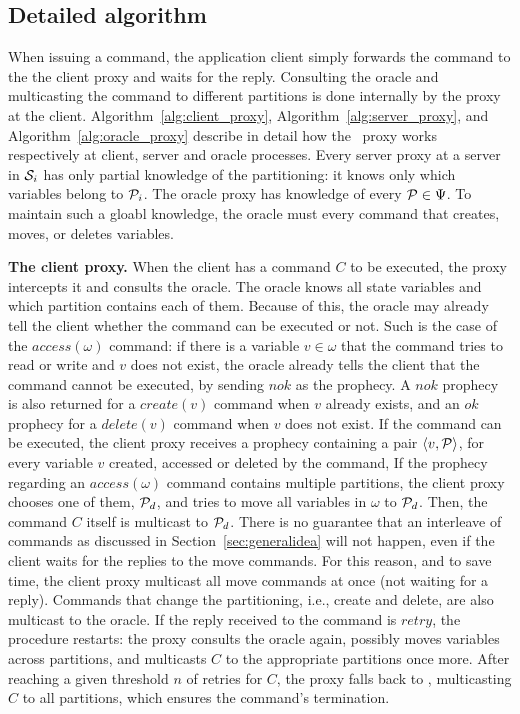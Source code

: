 \subsection{Detailed algorithm}
\label{sec:algorithm}


When issuing a command, the application client simply forwards the command to the the client proxy and waits for the reply.
Consulting the oracle and multicasting the command to different partitions is done internally by the proxy at the client.
Algorithm~\ref{alg:client_proxy}, Algorithm~\ref{alg:server_proxy}, and Algorithm~\ref{alg:oracle_proxy} describe in detail how the \dssmr\ proxy works respectively at client, server and oracle processes.
Every server proxy at a server in $\mathcal{S}_i$ has only partial knowledge of the partitioning: it knows only which variables belong to $\mathcal{P}_i$.
The oracle proxy has knowledge of every $\mathcal{P} \in \Psi$.
To maintain such a gloabl knowledge, the oracle must \amdel{} every command that creates, moves, or deletes variables.



\textbf{The client proxy.} When the client has a command $C$ to be executed, the proxy intercepts it and consults the oracle.
The oracle knows all state variables and which partition contains each of them.
Because of this, the oracle may already tell the client whether the command can be executed or not.
Such is the case of the $access(\omega)$ command: if there is a variable $v \in \omega$ that the command tries to read or write and $v$ does not exist, the oracle already tells the client that the command cannot be executed, by sending $nok$ as the prophecy.
A $nok$ prophecy is also returned for a $create(v)$ command when $v$ already exists, and an $ok$ prophecy for a $delete(v)$ command when $v$ does not exist.
If the command can be executed, the client proxy receives a prophecy containing a pair $\langle v, \mathcal{P} \rangle$, for every variable $v$ created, accessed or deleted by the command, 
If the prophecy regarding an $access(\omega)$ command contains multiple partitions, the client proxy chooses one of them, $\mathcal{P}_d$, and tries to move all variables in $\omega$ to $\mathcal{P}_d$.
Then, the command $C$ itself is multicast to $\mathcal{P}_d$.
There is no guarantee that an interleave of commands as discussed in Section~\ref{sec:generalidea} will not happen, even if the client waits for the replies to the move commands.
For this reason, and to save time, the client proxy multicast all move commands at once (not waiting for a reply).
Commands that change the partitioning, i.e., create and delete, are also multicast to the oracle.
If the reply received to the command is $retry$, the procedure restarts: the proxy consults the oracle again, possibly moves variables across partitions, and multicasts $C$ to the appropriate partitions once more.
After reaching a given threshold $n$ of retries for $C$, the proxy falls back to \ssmr{}, multicasting $C$ to all partitions, which ensures the command's termination.

